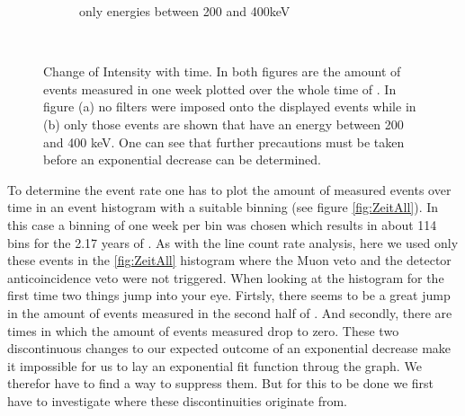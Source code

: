 \documentclass[encoding=utf8,british]{tumphthesis}
\begin{document}
\begin{figure}[t!]
\begin{subfigure}{.5\textwidth}
		\caption{only energies between 200 and 400keV}
		\label{fig:ZeitLimits}
	\end{subfigure}
    \\
    \caption{Change of Intensity with time. In both figures are the amount of events measured in one week plotted over the whole time of \PII. In figure (a) no filters were imposed onto the displayed events while in (b) only those events are shown that have an energy between 200 and 400 keV. One can see that further precautions must be taken before an exponential decrease can be determined. }
\end{figure}

To determine the event rate one has to plot the amount of measured events over time in an event histogram with a suitable binning (see figure \ref{fig:ZeitAll}).
In this case a binning of one week per bin was chosen which results in about 114 bins for the 2.17 years of \PII.
As with the line count rate analysis, here we used only these events in the \ref{fig:ZeitAll} histogram where the Muon veto and the detector anticoincidence veto were not triggered.
When looking at the histogram for the first time two things jump into your eye.
Firtsly, there seems to be a great jump in the amount of events measured in the second half of \PII.
And secondly, there are times in which the amount of events measured drop to zero.
These two discontinuous changes to our expected outcome of an exponential decrease make it impossible for us to lay an exponential fit function throug the graph.
We therefor have to find a way to suppress them.
But for this to be done we first have to investigate where these discontinuities originate from.
\\
\end{document}

